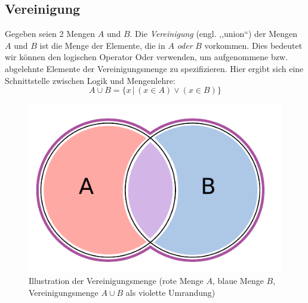 \subsection{Vereinigung}
%
Gegeben seien 2 Mengen $A$ und $B$. Die \emph{Vereinigung} (engl. ,,union``) der Mengen
$A$ und $B$ ist die Menge der Elemente, die in $A$ \emph{oder} $B$ vorkommen.
Dies bedeutet wir können den logischen Operator Oder verwenden, um aufgenommene
bzw. abgelehnte Elemente der Vereinigungsmenge zu spezifizieren. Hier ergibt
sich eine Schnittstelle zwischen Logik und Mengenlehre:
%
\[
    A \cup B = \{x \,|\, (x \in A) \lor (x \in B)\}
\]
%
\begin{figure}[p]
 \begin{center}
  \includegraphics{img/union.pdf}
  \caption{Illustration der Vereinigungsmenge (rote Menge $A$, blaue Menge $B$,
        Vereinigungsmenge $A \cup B$ als violette Umrandung)}
  \label{fig:union}
 \end{center}
\end{figure}

